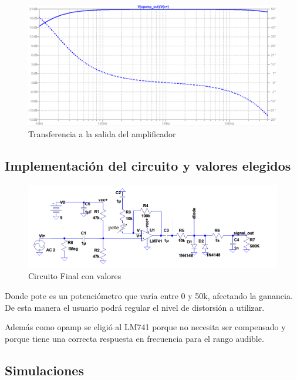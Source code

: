 \documentclass[../../main.tex]{subfiles}
\begin{document}
\begin{figure}[H]
	\centering
	\includegraphics[scale=.4]{imagenes/bode_opamp_simulacion_300mv.png}
	\caption{Transferencia a la salida del amplificador}
	\label{fig:ej5_transferencia_opamp}
\end{figure}

\subsection{Implementación del circuito y valores elegidos}

\begin{figure}[H]
	\centering
	\includegraphics[scale=1]{imagenes/circuito_final.png}
	\caption{Circuito Final con valores}
	\label{fig:ej5_circuito_final}
\end{figure}

Donde pote es un potenciómetro que varía entre 0 y 50k, afectando la ganancia. De esta manera el usuario podrá regular el nivel de distorsión a utilizar. \par
Además como opamp se eligió al LM741 porque no necesita ser compensado y porque tiene una correcta respuesta en frecuencia para el rango audible. 

\subsection{Simulaciones}
\end{document}
